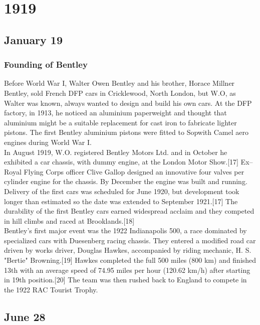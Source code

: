 \documentclass[11pt]{report}
\begin{document}
\chapter{1919}
\section{January 19}
\subsection{Founding of Bentley}
Before World War I, Walter Owen Bentley and his brother, Horace Millner Bentley, sold French DFP cars in Cricklewood, North London, but W.O, as Walter was known, always wanted to design and build his own cars. At the DFP factory, in 1913, he noticed an aluminium paperweight and thought that aluminium might be a suitable replacement for cast iron to fabricate lighter pistons. The first Bentley aluminium pistons were fitted to Sopwith Camel aero engines during World War I.\\
In August 1919, W.O. registered Bentley Motors Ltd. and in October he exhibited a car chassis, with dummy engine, at the London Motor Show.[17] Ex–Royal Flying Corps officer Clive Gallop designed an innovative four valves per cylinder engine for the chassis. By December the engine was built and running. Delivery of the first cars was scheduled for June 1920, but development took longer than estimated so the date was extended to September 1921.[17] The durability of the first Bentley cars earned widespread acclaim and they competed in hill climbs and raced at Brooklands.[18]\\
Bentley's first major event was the 1922 Indianapolis 500, a race dominated by specialized cars with Duesenberg racing chassis. They entered a modified road car driven by works driver, Douglas Hawkes, accompanied by riding mechanic, H. S. "Bertie" Browning.[19] Hawkes completed the full 500 miles (800 km) and finished 13th with an average speed of 74.95 miles per hour (120.62 km/h) after starting in 19th position.[20] The team was then rushed back to England to compete in the 1922 RAC Tourist Trophy.
\section{June 28}
\end{document}
